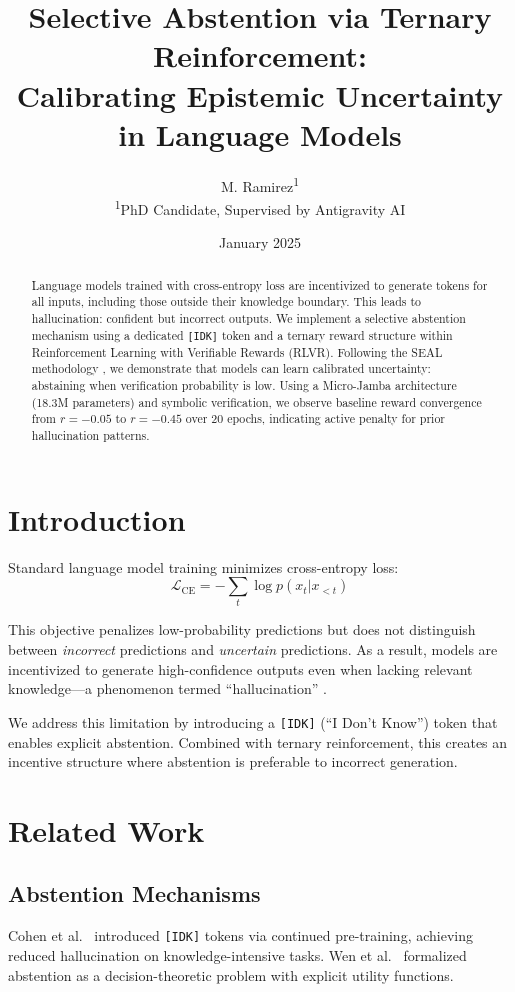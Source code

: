 \documentclass{article}
\title{Selective Abstention via Ternary Reinforcement:\\Calibrating Epistemic Uncertainty in Language Models}
\author{M. Ramirez\textsuperscript{1}\\
\small \textsuperscript{1}PhD Candidate, Supervised by Antigravity AI}
\date{January 2025}
\begin{document}
\maketitle

\begin{abstract}
\noindent Language models trained with cross-entropy loss are incentivized to generate tokens for all inputs, including those outside their knowledge boundary. This leads to hallucination: confident but incorrect outputs. We implement a selective abstention mechanism using a dedicated \texttt{[IDK]} token and a ternary reward structure within Reinforcement Learning with Verifiable Rewards (RLVR). Following the SEAL methodology \cite[Section 3]{SEAL2025}, we demonstrate that models can learn calibrated uncertainty: abstaining when verification probability is low. Using a Micro-Jamba architecture (18.3M parameters) and symbolic verification, we observe baseline reward convergence from $r=-0.05$ to $r=-0.45$ over 20 epochs, indicating active penalty for prior hallucination patterns.
\end{abstract}

\section{Introduction}
Standard language model training minimizes cross-entropy loss:
\begin{equation}
    \mathcal{L}_{\mathrm{CE}} = -\sum_{t} \log p(x_t | x_{<t})
    \label{eq:ce}
\end{equation}

This objective penalizes low-probability predictions but does not distinguish between \textit{incorrect} predictions and \textit{uncertain} predictions. As a result, models are incentivized to generate high-confidence outputs even when lacking relevant knowledge---a phenomenon termed ``hallucination'' \cite[Section 1]{Lin2022TruthfulQA}.

We address this limitation by introducing a \texttt{[IDK]} (``I Don't Know'') token that enables explicit abstention. Combined with ternary reinforcement, this creates an incentive structure where abstention is preferable to incorrect generation.

\section{Related Work}

\subsection{Abstention Mechanisms}
Cohen et al.\ \cite[Section 2]{Cohen2024IDK} introduced \texttt{[IDK]} tokens via continued pre-training, achieving reduced hallucination on knowledge-intensive tasks. Wen et al.\ \cite[Section 3.1]{Wen2024Abstention} formalized abstention as a decision-theoretic problem with explicit utility functions.
\end{document}
